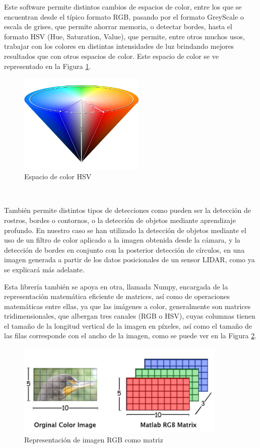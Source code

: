 Este software permite distintos cambios de espacios de color, entre los que se
encuentran desde el típico formato RGB, pasando por el formato GreyScale o
escala de grises, que permite ahorrar memoria, o detectar bordes, hasta el
formato HSV (Hue, Saturation, Value), que permite, entre otros muchos usos,
trabajar con los colores en distintas intensidades de luz brindando mejores
resultados que con otros espacios de color.
Este espacio de color se ve representado en la Figura \ref{fig:hsv}.

\begin{figure} [h!]
  \begin{center}
    \includegraphics[width=6cm]{figs/hsv_cone}
  \end{center}
  \caption{Espacio de color HSV \citep{hsv_cone}}
  \label{fig:hsv}
\end{figure}\

También permite distintos tipos de detecciones como pueden ser la detección de
rostros, bordes o contornos, o la detección de objetos mediante aprendizaje
profundo.
En nuestro caso se han utilizado la detección de objetos mediante el uso de un
filtro de color aplicado a la imagen obtenida desde la cámara, y la detección de
bordes en conjunto con la posterior detección de círculos, en una imagen
generada a partir de los datos posicionales de un sensor LIDAR, como ya se
explicará más adelante.

Esta librería también se apoya en otra, llamada Numpy, encargada de la
representación matemática eficiente de matrices, así como de operaciones
matemáticas entre ellas, ya que las imágenes a color, generalmente son matrices
tridimensionales, que albergan tres canales (RGB o HSV), cuyas columnas tienen
el tamaño de la longitud vertical de la imagen en píxeles, así como el tamaño de
las filas corresponde con el ancho de la imagen, como se puede ver en la Figura
\ref{fig:rgb_mat}.

\begin{figure} [h!]
  \begin{center}
    \includegraphics[width=10cm]{figs/rgb_matrix}
  \end{center}
  \caption{Representación de imagen RGB como matriz \citep{rgb_mat}}
  \label{fig:rgb_mat}
\end{figure}\


